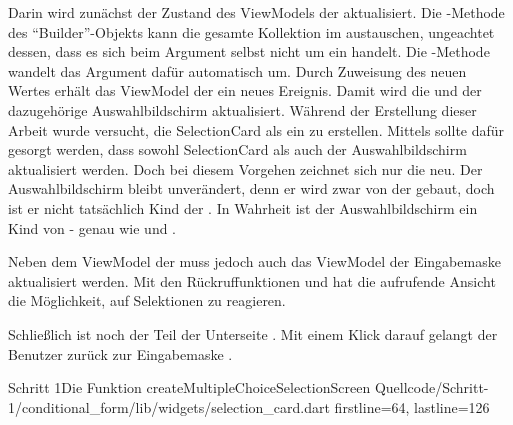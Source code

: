 Darin wird zunächst der Zustand des ViewModels der  aktualisiert.
Die -Methode des \enquote{Builder}-Objekts kann die gesamte Kollektion im  austauschen, ungeachtet dessen, dass es sich beim Argument selbst nicht um ein  handelt.
Die -Methode wandelt das Argument dafür automatisch um.
Durch Zuweisung des neuen Wertes erhält das ViewModel der  ein neues Ereignis.
Damit wird die  und der dazugehörige Auswahlbildschirm aktualisiert.
Während der Erstellung dieser Arbeit wurde versucht, die SelectionCard als ein  zu erstellen.
Mittels  sollte dafür gesorgt werden, dass sowohl SelectionCard als auch der Auswahlbildschirm aktualisiert werden.
Doch bei diesem Vorgehen zeichnet sich nur die  neu.
Der Auswahlbildschirm bleibt unverändert, denn er wird zwar von der  gebaut, doch ist er nicht tatsächlich Kind der .
In Wahrheit ist der Auswahlbildschirm ein Kind von  - genau wie  und .

Neben dem ViewModel der  muss jedoch auch das ViewModel der Eingabemaske aktualisiert werden.
Mit den Rückruffunktionen   und   hat die aufrufende Ansicht die Möglichkeit, auf Selektionen zu reagieren.

Schließlich ist noch der  Teil der Unterseite .
Mit einem Klick darauf gelangt der Benutzer zurück zur Eingabemaske .


\begin{alexlisting}{Schritt 1}{Die Funktion createMultipleChoiceSelectionScreen}
  {Quellcode/Schritt-1/conditional_form/lib/widgets/selection_card.dart}
  {firstline=64, lastline=126}
  \label{lst:Schritt1FunktionCreateMultipleChoiceSelectionScreen}
\end{alexlisting}
 
 
\ifincludeall \clearpage \fi